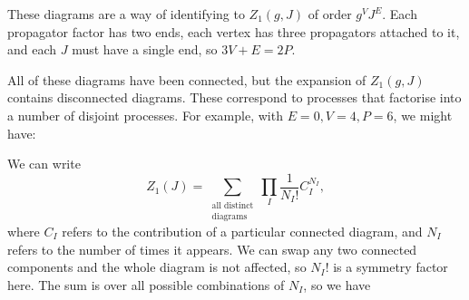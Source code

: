 \documentclass{jknotes} %
\begin{document}
These diagrams are a way of identifying to \(Z_1(g,J)\) of order \(g^VJ^E\). Each propagator factor has two ends, each vertex has three propagators attached to it, and each \(J\) must have a single end, so \(3V+E=2P\).

All of these diagrams have been connected, but the expansion of \(Z_1(g,J)\) contains disconnected diagrams. These correspond to processes that factorise into a number of disjoint processes. For example, with \(E=0,V=4,P=6\), we might have:
\begin{figure}[H]
    \centering
\end{figure}
We can write
\begin{equation}
    Z_1(J) = \sum_{\substack{\text{all distinct}\\\text{diagrams}}} \prod_I \frac{1}{N_I!}C_I^{N_I},
\end{equation}
where \(C_I\) refers to the contribution of a particular connected diagram, and \(N_I\) refers to the number of times it appears. We can swap any two connected components and the whole diagram is not affected, so \(N_I!\) is a symmetry factor here. The sum is over all possible combinations of \(N_I\), so we have
\end{document}
